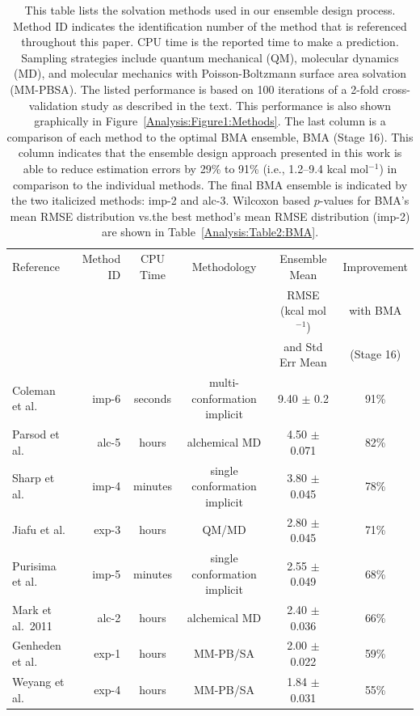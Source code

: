 \documentclass[journal=jpcbfk, manuscript=article]{achemso}
\newcommand{\+}[1]{\ensuremath{\mathbf{#1}}}
\begin{document}
\begin{table}[t]
	\centering
	\caption[Ensemble Constituents]{This table lists the solvation methods used in our ensemble design process.
	Method ID indicates the identification number of the method that is referenced throughout this paper.
	CPU time is the reported time to make a prediction.
	Sampling strategies include quantum mechanical (QM), molecular dynamics (MD), and molecular mechanics with Poisson-Boltzmann surface area solvation (MM-PBSA).
	The listed performance is based on 100 iterations of a 2-fold cross-validation study as described in the text.
	This performance is also shown graphically in Figure~\ref{Analysis:Figure1:Methods}.
	The last column is a comparison of each method to the optimal BMA ensemble, BMA (Stage 16).
	This column indicates that the ensemble design approach presented in this work is able to reduce estimation errors by 29\% to 91\% (i.e., 1.2--9.4 kcal mol$^{-1}$) in comparison to the individual methods.
	The final BMA ensemble is indicated by the two italicized methods: imp-2 and alc-3.
	Wilcoxon based $p$-values for BMA's mean RMSE distribution vs.\@ the best method's mean RMSE distribution (imp-2) are shown in Table~\ref{Analysis:Table2:BMA}.}
	\scriptsize
	\begin{tabular}{l|r|c|c|c|c}
		\hline
		\hline
		Reference 	& Method	ID & CPU Time & Methodology  &Ensemble Mean				& Improvement \\
					&  		&			&	& RMSE (kcal mol$^{-1}$)	& with BMA  \\
					& 			&		&		& and Std Err Mean	& (Stage 16) \\
		\hline
		Coleman et al.~\cite{Coleman:2014} & imp-6  & seconds & multi-conformation implicit & 9.40 $\pm$ 0.2 & 91\% \\
		Parsod et al. & alc-5 & hours & alchemical MD & 4.50 $\pm$ 0.071 & 82\% \\ 
		Sharp et al.~\cite{Yang:2006} & imp-4 &minutes& single conformation implicit & 3.80 $\pm$ 0.045 & 78\% \\
		Jiafu et al. & exp-3 &hours& QM/MD & 2.80 $\pm$ 0.045 & 71\% \\
		Purisima et al.~\cite{Hogues:2014} & imp-5&minutes  & single conformation implicit & 2.55 $\pm$ 0.049 & 68\%\\
		Mark et al.~2011 & alc-2 & hours&alchemical MD & 2.40 $\pm$ 0.036 & 66\%\\ 
		Genheden et al.~\cite{Genheden:2014} & exp-1&hours  & MM-PB/SA & 2.00 $\pm$ 0.022 & 59\%\\
		Weyang et al. & exp-4 &hours & MM-PB/SA & 1.84 $\pm$ 0.031 & 55\%\\		

\end{tabular}
\end{table}
\end{document}
